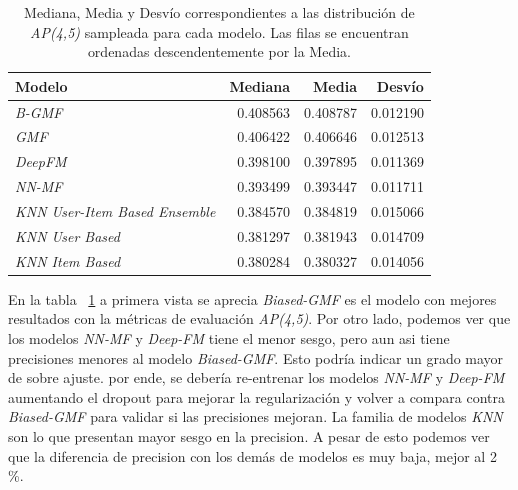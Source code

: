 \documentclass[11pt,a4paper,twoside]{thesis}
\begin{document}
{\begin{table}[!htb]
	\centering
	\footnotesize
	\begin{tabular}{lrrr}
		\hline
		Modelo                                & Mediana  & Media    & Desvío   \\
		\hline
		\textit{B-GMF}                        & 0.408563 & 0.408787 & 0.012190 \\
		\textit{GMF}                          & 0.406422 & 0.406646 & 0.012513 \\
		\textit{DeepFM}                       & 0.398100 & 0.397895 & 0.011369 \\
		\textit{NN-MF}                        & 0.393499 & 0.393447 & 0.011711 \\
		\textit{KNN User-Item Based Ensemble} & 0.384570 & 0.384819 & 0.015066 \\
		\textit{KNN User Based}               & 0.381297 & 0.381943 & 0.014709 \\
		\textit{KNN Item Based}               & 0.380284 & 0.380327 & 0.014056 \\
		\hline
	\end{tabular}
	\caption{
		Mediana, Media y Desvío correspondientes a las distribución de
		\textit{AP(4,5)} sampleada para cada modelo. Las filas se encuentran ordenadas descendentemente por la Media.
	}
	\label{table:ap_at_k}
\end{table}

En la tabla ~\ref{table:ap_at_k} a primera vista se aprecia \textit{Biased-GMF}
es el modelo con mejores resultados con la métricas de evaluación
\textit{AP(4,5)}. Por otro lado, podemos ver que los modelos
\textit{NN-MF} y \textit{Deep-FM} tiene el menor sesgo, pero aun asi tiene
precisiones menores al modelo \textit{Biased-GMF}. Esto podría indicar un grado
mayor de sobre ajuste. por ende, se debería re-entrenar los modelos
\textit{NN-MF} y \textit{Deep-FM} aumentando el dropout para mejorar la
regularización y volver a compara contra \textit{Biased-GMF} para validar si
las precisiones mejoran. La familia de modelos \textit{KNN} son lo que
presentan mayor sesgo en la precision. A pesar de esto podemos ver que la
diferencia de precision con los demás de modelos es muy baja, mejor al 2 \%.

}
\end{document}
